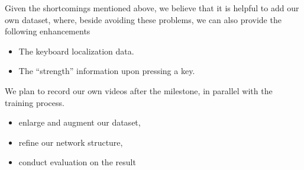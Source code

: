\documentclass[10pt,twocolumn,letterpaper]{article}
\begin{document}
Given the shortcomings mentioned above, we believe that it is helpful to add our own dataset, where, beside avoiding these problems, we can also provide the following enhancements

\begin{itemize}
  \item The keyboard localization data.
  \item The ``strength'' information upon pressing a key.
\end{itemize}

We plan to record our own videos after the milestone, in parallel with the training process.


\begin{itemize}
  \item enlarge and augment our dataset,
  \item refine our network structure,
  \item conduct evaluation on the result
\end{itemize}

{\small


}
\end{document}
